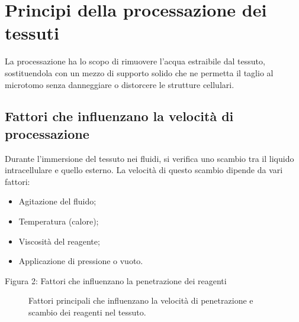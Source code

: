 


\section{Principi della processazione dei tessuti}
La processazione ha lo scopo di rimuovere l’acqua estraibile dal tessuto, sostituendola con un mezzo di supporto solido che ne permetta il taglio al microtomo senza danneggiare o distorcere le strutture cellulari.

\subsection{Fattori che influenzano la velocità di processazione}
Durante l’immersione del tessuto nei fluidi, si verifica uno scambio tra il liquido intracellulare e quello esterno. La velocità di questo scambio dipende da vari fattori:

\begin{itemize}
    \item Agitazione del fluido;
    \item Temperatura (calore);
    \item Viscosità del reagente;
    \item Applicazione di pressione o vuoto.
\end{itemize}
 Figura 2: Fattori che influenzano la penetrazione dei reagenti
\begin{figure}[htbp]
  \centering
  \caption{Fattori principali che influenzano la velocità di penetrazione e scambio dei reagenti nel tessuto.}
  \label{fig:factors-penetrazione}
\end{figure}


